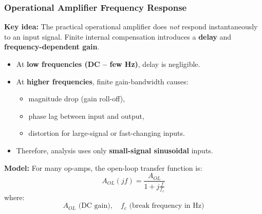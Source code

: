 \begin{frame}
	\frametitle{Operational Amplifier Frequency Response}
	\small
	\textbf{Key idea:} The practical operational amplifier does \emph{not} respond instantaneously to an input signal.  
	Finite internal compensation introduces a \textbf{delay} and \textbf{frequency-dependent gain}.
	\begin{itemize}
		\item At \textbf{low frequencies (DC – few Hz)}, delay is negligible.
		\item At \textbf{higher frequencies}, finite gain-bandwidth causes:
		\begin{itemize}
			\item magnitude drop (gain roll-off),
			\item phase lag between input and output,
			\item distortion for large-signal or fast-changing inputs.
		\end{itemize}
		\item Therefore, analysis uses only \textbf{small-signal sinusoidal} inputs.
	\end{itemize}
	\textbf{Model:}  
	For many op-amps, the open-loop transfer function is:
	\begin{equation}
		A_{OL}(j f) = \frac{A_{OL}}{1 + j\frac{f}{f_c}}
	\end{equation}
	where:
	\begin{equation}
		A_{OL} \text{ (DC gain)},\quad f_c \text{ (break frequency in Hz)}
	\end{equation}
\end{frame}

